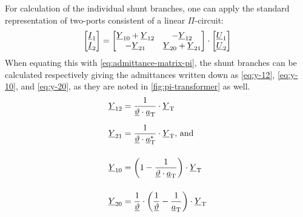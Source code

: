 For calculation of the individual shunt branches, one can apply the standard representation of two-ports consistent of a linear $\Pi$-circuit:
\begin{align}
    \begin{bmatrix}
        \underline{I}_1 \\ \underline{I}_2
    \end{bmatrix}=
    \begin{bmatrix}
        \underline{Y}_{10} + \underline{Y}_{12}& -\underline{Y}_{12} \\
        -\underline{Y}_{21} & \underline{Y}_{20} + \underline{Y}_{21}
    \end{bmatrix} \cdot
    \begin{bmatrix}
        \underline{U}_1 \\ \underline{U}_2
    \end{bmatrix} \notag %
\end{align}
When equating this with \autoref{eq:admittance-matrix-pi}, the shunt branches can be calculated respectively giving the admittances written down as \autoref{eq:y-12}, \autoref{eq:y-10}, and \autoref{eq:y-20}, as they are noted in \autoref{fig:pi-transformer} as well. \autocite{milano_2010,burlakin_2024}
\begin{align}
    \underline{Y}_{12}&=\frac{1}{\underline{\vartheta} \cdot \underline{a}_\mathrm{T}} \cdot \underline{Y}_\mathrm{T} \notag \\[6pt]
    \underline{Y}_{21}&=\frac{1}{\underline{\vartheta} \cdot \underline{a}_\mathrm{T}^*} \cdot \underline{Y}_\mathrm{T}\text{, and} \label{eq:y-12} \\[12pt]
    \underline{Y}_{10}&=\bigg(1 - \frac{1}{\underline{\vartheta} \cdot \underline{a}_\mathrm{T}}\bigg) \cdot \underline{Y}_\mathrm{T} \label{eq:y-10} \\[12pt]
    \underline{Y}_{20}&=\frac{1}{\underline{\vartheta}} \cdot \bigg(\frac{1}{\underline{\vartheta}} - \frac{1}{\underline{a}_\mathrm{T}}\bigg) \cdot \underline{Y}_\mathrm{T} \label{eq:y-20} 
\end{align}

